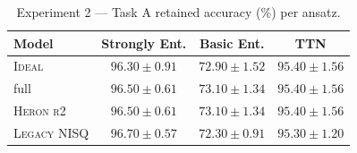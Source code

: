 \begin{table}[ht]
\centering
\caption{Experiment 2 — Task A retained accuracy (\%) per ansatz.}
\label{tab:topology}
\begin{tabular}{lccc}
\toprule
\textbf{Model} & Strongly Ent. & Basic Ent. & TTN \\
\midrule
\textsc{Ideal} & $96.30 \pm 0.91$ & $72.90 \pm 1.52$ & $95.40 \pm 1.56$ \\
full & $96.50 \pm 0.61$ & $73.10 \pm 1.34$ & $95.40 \pm 1.56$ \\
\textsc{Heron r2} & $96.50 \pm 0.61$ & $73.10 \pm 1.34$ & $95.40 \pm 1.56$ \\
\textsc{Legacy NISQ} & $96.70 \pm 0.57$ & $72.30 \pm 0.91$ & $95.30 \pm 1.20$ \\
\bottomrule
\end{tabular}
\end{table}
